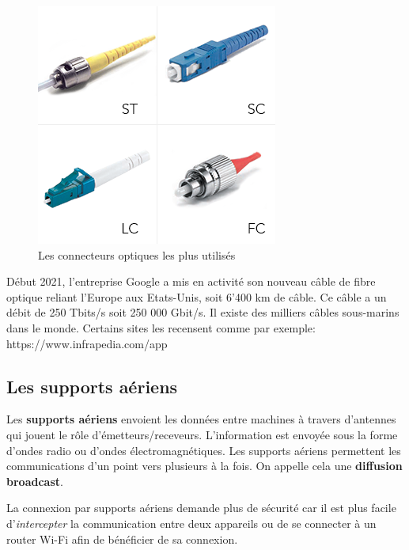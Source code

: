 \documentclass[11pt, a4paper]{book}
\begin{document}
\begin{figure}[h]
\begin{center}
\includegraphics[scale=.5]{images/connecteurs-fibre-optique.png}
\caption{Les connecteurs optiques les plus utilisés}
\end{center}
\end{figure}


\begin{remarque}
Début 2021, l'entreprise Google a mis en activité son nouveau câble de fibre optique reliant l'Europe aux Etats-Unis, soit 6'400 km de câble. Ce câble a un débit de 250 Tbits/s soit 250 000 Gbit/s. Il existe des milliers câbles sous-marins dans le monde. Certains sites les recensent  comme par exemple: https://www.infrapedia.com/app
\end{remarque}




\subsection{Les supports aériens}

\begin{defi}
Les {\bf supports aériens} envoient les données entre machines à travers d'antennes qui jouent le rôle d'émetteurs/receveurs. L'information est envoyée sous la forme d'ondes radio ou d'ondes  électromagnétiques. Les supports aériens permettent les communications d'un point vers plusieurs à la fois. On appelle cela une {\bf diffusion broadcast}.
\end{defi}


\begin{remarque}
La connexion par supports aériens demande plus de sécurité car il est plus facile d'{\it intercepter} la communication entre deux appareils ou de se connecter à un router Wi-Fi afin de bénéficier de sa connexion. 
\end{remarque}
\end{document}
